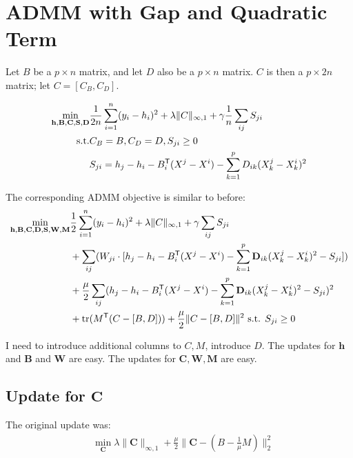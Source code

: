 \documentclass{article}
\begin{document}
\section{ADMM with Gap and Quadratic Term}

Let $B$ be a $p\times n$ matrix, and let $D$ also be a $p\times n$ matrix. $C$ is then a $p\times 2n$ matrix; let $C = [C_B, C_D]$.

\begin{align*}
\min_{\mathbf{h}, \mathbf{B}, \mathbf{C},\mathbf{S},\mathbf{D}}
& \frac{1}{2n}\sum_{i=1}^n(y_i - h_i)^2 + \lambda \|C\|_{\infty,1} + \gamma \frac{1}{n} \sum_{ij} S_{ji} \\
\textrm{s.t.} & C_B = B, C_D = D, S_{ji} \geq 0 \\
	& S_{ji} = h_j - h_i - B_i^{\mathsf{T}}(X^j - X^i) - \sum_{k=1}^p D_{ik} (X^j_k - X^i_k)^2
\end{align*}

The corresponding ADMM objective is similar to before:
\begin{align*}
\min_{\mathbf{h},\mathbf{B},\mathbf{C},\mathbf{D},\mathbf{S},\mathbf{W},\mathbf{M}} &
\frac{1}{2}\sum_{i=1}^n (y_i - h_i)^2 + \lambda \|C\|_{\infty,1} + \gamma \sum_{ij}S_{ji} \\
& +\sum_{ij} (W_{ji} \cdot [ h_j - h_i - B_i^{\mathsf{T}}(X^j - X^i) - \sum_{k=1}^p \mathbf{D}_{ik} (X^j_k - X^i_k)^2 - S_{ji}]) \\
& + \frac{\mu}{2} \sum_{ij} ( h_j - h_i - B_i^{\mathsf{T}} (X^j - X^i) -\sum_{k=1}^p \mathbf{D}_{ik} (X^j_k - X^i_k)^2-S_{ji})^2 \\
& + \mathrm{tr}(M^{\mathsf{T}} (C - [B,D])) + \frac{\mu}{2} \| C - [B,D]\|^2 \textrm{ s.t. } S_{ji} \geq 0
\end{align*}

I need to introduce additional columns to $C, M$, introduce $D$. 
The updates for $\mathbf{h}$ and $\mathbf{B}$ and $\mathbf{W}$ are easy. The updates for $\mathbf{C},\mathbf{W},\mathbf{M}$ are easy.\\

\subsection{Update for $\mathbf{C}$}

The original update was:
\begin{align*}
& \min_{\mathbf{C}} \lambda \|\mathbf{C}\|_{\infty,1} + \frac{\mu}{2} \| \mathbf{C} - (B - \frac{1}{\mu} M ) \|_2^2 \\
\end{align*}
\end{document}
